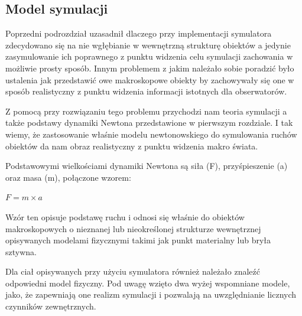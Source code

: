 \subsection{Model symulacji}
\par{
Poprzedni podrozdział uzasadnił dlaczego przy implementacji symulatora zdecydowano się na nie wgłębianie w wewnętrzną strukturę obiektów a jedynie zasymulowanie ich poprawnego z punktu widzenia celu symulacji zachowania w możliwie prosty sposób. Innym problemem z jakim należało sobie poradzić było ustalenia jak przedstawić owe makroskopowe obiekty by zachowywały się one w sposób realistyczny z punktu widzenia informacji istotnych dla obserwatorów.
}
\par{
Z pomocą przy rozwiązaniu tego problemu przychodzi nam teoria symulacji a także podstawy dynamiki Newtona przedstawione w pierwszym rozdziale.
I tak wiemy, że zastosowanie właśnie modelu newtonowskiego do symulowania ruchów obiektów da nam obraz realistyczny z punktu widzenia makro świata.
}
\par{
Podstawowymi wielkościami dynamiki Newtona są siła (F), przyśpieszenie (a) oraz masa (m), połączone wzorem:
\begin{center}
$F = m \times a$
\end{center}
Wzór ten opisuje podstawę ruchu i odnosi się właśnie do obiektów makroskopowych o nieznanej lub nieokreślonej strukturze wewnętrznej opisywanych modelami fizycznymi takimi jak punkt materialny lub bryła sztywna.
}
\par{
Dla ciał opisywanych przy użyciu symulatora również należało znaleźć odpowiedni model fizyczny. Pod uwagę wzięto dwa wyżej wspomniane modele, jako, że zapewniają one realizm symulacji i pozwalają na uwzględnianie licznych czynników zewnętrznych.
}
